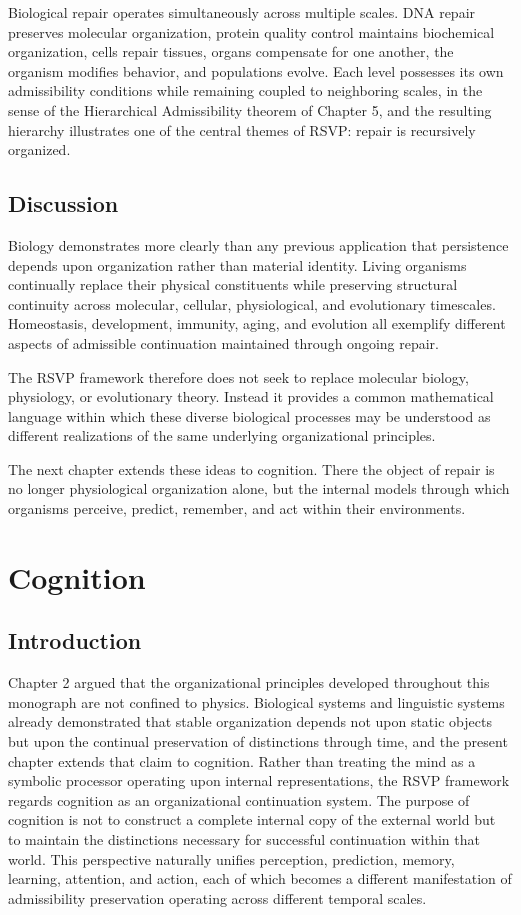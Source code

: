 \documentclass[11pt,oneside]{book}
\numberwithin{equation}{chapter}
\theoremstyle{definition}
\theoremstyle{plain}
\begin{document}
Biological repair operates simultaneously across multiple scales. DNA repair preserves molecular organization, protein quality control maintains biochemical organization, cells repair tissues, organs compensate for one another, the organism modifies behavior, and populations evolve. Each level possesses its own admissibility conditions while remaining coupled to neighboring scales, in the sense of the Hierarchical Admissibility theorem of Chapter 5, and the resulting hierarchy illustrates one of the central themes of RSVP: repair is recursively organized.

\section{Discussion}

Biology demonstrates more clearly than any previous application that
persistence depends upon organization rather than material identity. Living
organisms continually replace their physical constituents while preserving
structural continuity across molecular, cellular, physiological, and
evolutionary timescales. Homeostasis, development, immunity, aging, and
evolution all exemplify different aspects of admissible continuation
maintained through ongoing repair.

The RSVP framework therefore does not seek to replace molecular biology,
physiology, or evolutionary theory. Instead it provides a common
mathematical language within which these diverse biological processes may
be understood as different realizations of the same underlying
organizational principles.

The next chapter extends these ideas to cognition. There the object of
repair is no longer physiological organization alone, but the internal
models through which organisms perceive, predict, remember, and act within
their environments.

\chapter{Cognition}

\section{Introduction}

Chapter 2 argued that the organizational principles developed throughout this monograph are not confined to physics. Biological systems and linguistic systems already demonstrated that stable organization depends not upon static objects but upon the continual preservation of distinctions through time, and the present chapter extends that claim to cognition. Rather than treating the mind as a symbolic processor operating upon internal representations, the RSVP framework regards cognition as an organizational continuation system. The purpose of cognition is not to construct a complete internal copy of the external world but to maintain the distinctions necessary for successful continuation within that world. This perspective naturally unifies perception, prediction, memory, learning, attention, and action, each of which becomes a different manifestation of admissibility preservation operating across different temporal scales.
\end{document}
